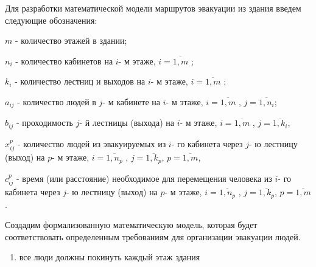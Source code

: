 Для разработки математической модели маршрутов эвакуации из здания
введем следующие обозначения:

\(m\) - количество этажей в здании;

\(n_{i}\) - количество кабинетов на \(i\)- м этаже,
\(i = \overline{1,m}\) ;

\(k_{i}\) - количество лестниц и выходов на \(i\)- м этаже,
\(i = \overline{1,m}\) ;

\(a_{ij}\) - количество людей в \(j\)- м кабинете на \(i\)- м этаже,
\(i = \overline{1,m}\) , \(j = \overline{1,n_{i}}\);

\(b_{ij}\) - проходимость \(j\)- й лестницы (выхода) на \(i\)- м этаже,
\(i = \overline{1,m}\) , \(j = \overline{1,k_{i}}\),

\(x_{ij}^{p}\) - количество людей из эвакуируемых из \(i\)- го кабинета
через \(j\)- ю лестницу (выход) на \(p\)- м этаже,
\(i = \overline{1,n_{p}}\) , \(j = \overline{1,k_{p}}\),
\(p = \overline{1,m}\),

\(c_{ij}^{p}\) - время (или расстояние) необходимое для перемещения
человека из \(i\)- го кабинета через \(j\)- ю лестницу (выход) на \(p\)-
м этаже, \(i = \overline{1,n_{p}}\) , \(j = \overline{1,k_{p}}\),
\(p = \overline{1,m}\).

Создадим формализованную математическую модель, которая будет
соответствовать определенным требованиям для организации эвакуации
людей.

\begin{enumerate}
\def\labelenumi{\arabic{enumi})}
\item
  все люди должны покинуть каждый этаж здания
\end{enumerate}



